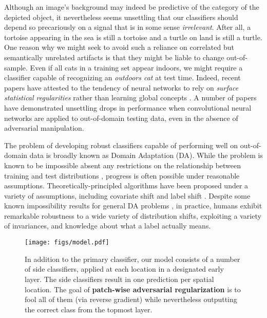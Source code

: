 \documentclass{article}
\begin{document}
Although an image's background may indeed be predictive
of the category of the depicted object,
it nevertheless seems unsettling that our classifiers
should depend so precariously on a signal 
that is in some sense \emph{irrelevant}.
After all, a tortoise appearing in the sea is still a tortoise
and a turtle on land is still a turtle. 
One reason why we might seek to avoid such a reliance 
on correlated but semantically unrelated artifacts 
is that they might be liable to change out-of-sample.
Even if all cats in a training set appear indoors,
we might require a classifier 
capable of recognizing an \emph{outdoors cat} at test time.
Indeed, recent papers have attested to the tendency 
of neural networks to rely on \emph{surface statistical regularities}
rather than learning global concepts \citep{jo2017measuring, geirhos2018imagenettrained}.
A number of papers have demonstrated unsettling drops in performance
when convolutional neural networks are applied to out-of-domain testing data,
even in the absence of adversarial manipulation.


The problem of developing robust classifiers 
capable of performing well on out-of-domain data 
is broadly known as Domain Adaptation (DA).
While the problem is known to be impossible 
absent any restrictions on the relationship 
between training and test distributions \citep{ben2010impossibility},
progress is often possible under reasonable assumptions.
Theoretically-principled algorithms have been proposed
under a variety of assumptions, including covariate shift 
\citep{shimodaira2000improving, gretton2009covariate}
and label shift 
\citep{storkey2009training, scholkopf2012causal, zhang2013domain, lipton2018detecting}. 
Despite some known impossibility results 
for general DA problems \citep{ben2010impossibility}, 
in practice, humans exhibit remarkable robustness 
to a wide variety of distribution shifts,
exploiting a variety of invariances,
and knowledge about what a label actually means.

\begin{figure}
    \centering
    \texttt{[image: figs/model.pdf]}
    \caption{
In addition to the primary classifier, our model consists of a number of side classifiers, applied at each  location in a designated early layer. 
    The side classifiers result in one prediction per spatial location. 
    The goal of \textbf{patch-wise adversarial regularization} 
    is to fool all of them (via reverse gradient) 
    while nevertheless outputting the correct class from the topmost layer.}
    \label{fig:model}
\end{figure}
\end{document}
